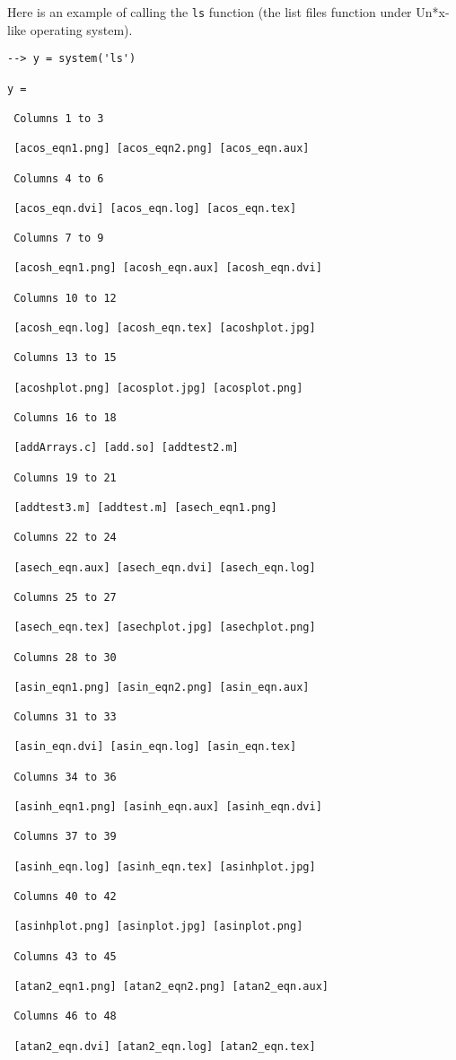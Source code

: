 Here is an example of calling the \verb|ls| function (the
list files function under Un*x-like operating system).
\begin{verbatim}
--> y = system('ls')

y = 

 Columns 1 to 3

 [acos_eqn1.png] [acos_eqn2.png] [acos_eqn.aux] 

 Columns 4 to 6

 [acos_eqn.dvi] [acos_eqn.log] [acos_eqn.tex] 

 Columns 7 to 9

 [acosh_eqn1.png] [acosh_eqn.aux] [acosh_eqn.dvi] 

 Columns 10 to 12

 [acosh_eqn.log] [acosh_eqn.tex] [acoshplot.jpg] 

 Columns 13 to 15

 [acoshplot.png] [acosplot.jpg] [acosplot.png] 

 Columns 16 to 18

 [addArrays.c] [add.so] [addtest2.m] 

 Columns 19 to 21

 [addtest3.m] [addtest.m] [asech_eqn1.png] 

 Columns 22 to 24

 [asech_eqn.aux] [asech_eqn.dvi] [asech_eqn.log] 

 Columns 25 to 27

 [asech_eqn.tex] [asechplot.jpg] [asechplot.png] 

 Columns 28 to 30

 [asin_eqn1.png] [asin_eqn2.png] [asin_eqn.aux] 

 Columns 31 to 33

 [asin_eqn.dvi] [asin_eqn.log] [asin_eqn.tex] 

 Columns 34 to 36

 [asinh_eqn1.png] [asinh_eqn.aux] [asinh_eqn.dvi] 

 Columns 37 to 39

 [asinh_eqn.log] [asinh_eqn.tex] [asinhplot.jpg] 

 Columns 40 to 42

 [asinhplot.png] [asinplot.jpg] [asinplot.png] 

 Columns 43 to 45

 [atan2_eqn1.png] [atan2_eqn2.png] [atan2_eqn.aux] 

 Columns 46 to 48

 [atan2_eqn.dvi] [atan2_eqn.log] [atan2_eqn.tex] 


\end{verbatim}
